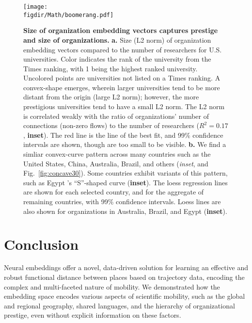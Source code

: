 \documentclass[12pt]{article} %
\def\figdir{../Figs}
\begin{document}
%
%
\begin{figure}[h!]
	\centering
	\texttt{[image: \\figdir/Math/boomerang.pdf]}
	\caption{
		\textbf{Size of organization embedding vectors captures prestige and size of organizations.}
		\textbf{a.} Size (L2 norm) of organization embedding vectors compared to the number of researchers for U.S. universities.
		Color indicates the rank of the university from the Times ranking, with 1 being the highest ranked university.
		Uncolored points are universities not listed on a Times ranking.
		A convex-shape emerges, wherein larger universities tend to be more distant from the origin (large L2 norm); however, the more prestigious universities tend to have a small L2 norm.
		The L2 norm is correlated weakly with the ratio of organizations' number of connections (non-zero flows) to the number of researchers ($R^{2} = 0.17$, \textbf{inset}).
		The red line is the line of the best fit, and 99\% confidence intervals are shown, though are too small to be visible.
		\textbf{b.} We find a simliar convex-curve pattern across many countries such as the United States, China, Australia, Brazil, and others (\textit{inset}, and Fig.~\ref{fig:concave30}). 
		Some countries exhibit variants of this pattern, such as Egypt 's ``S''-shaped curve (\textbf{inset}).
		The loess regression lines are shown for each selected country, and for the aggregate of remaining countries, with 99\% confidence intervals.
		Loess lines are also shown for organizations in Australia, Brazil, and Egypt (\textbf{inset}).
	}
	\label{fig:length}
\end{figure}


%
%
\section*{Conclusion}

Neural embeddings offer a novel, data-driven solution for learning an effective and robust functional distance between places based on trajectory data, encoding the complex and multi-faceted nature of mobility.
We demonstrated how the embedding space encodes various aspects of scientific mobility, such as the global and regional geography, shared languages, and the hierarchy of organizational prestige, even without explicit information on these factors.
\end{document}
